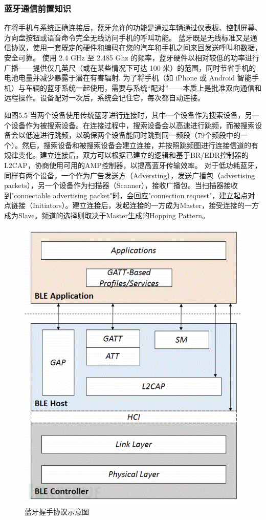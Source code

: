 \subsubsection{蓝牙通信前置知识}
在将手机与系统正确连接后，蓝牙允许的功能是通过车辆通过仪表板、控制屏幕、方向盘按钮或语音命令完全无线访问手机的呼叫功能。
蓝牙既是无线标准又是通信协议，使用一套既定的硬件和编码在您的汽车和手机之间来回发送呼叫和数据，安全可靠。
使用 2.4 GHz 至 2.485 Ghz 的频率，蓝牙硬件以相对较低的功率进行广播——提供仅几英尺（或在某些情况下可达 100 米）的范围，同时节省手机的电池电量并减少暴露于潜在有害辐射.
为了将手机（如 iPhone 或 Android 智能手机）与车辆的蓝牙系统一起使用，需要与系统“配对”——本质上是批准双向通信和远程操作。设备配对一次后，系统会记住它，每次都自动连接。

如图5.5 当两个设备使用传统蓝牙进行连接时，其中一个设备作为搜索设备，另一个设备作为被搜索设备。在连接过程中，搜索设备会以高速进行跳频，而被搜索设备会以低速进行跳频，以确保两个设备能同时跳到同一频段（79个频段中的一个）。然后，搜索设备和被搜索设备会建立连接，并按照跳频图进行连接信道的有规律变化。建立连接后，双方可以根据已建立的逻辑和基于BR/EDR控制器的L2CAP，协商使用可用的AMP控制器，以提高蓝牙传输效率。
对于低功耗蓝牙，同样有两个设备，一个作为广告发送方（Adversting），发送广播包（advertising packets），另一个设备作为扫描器（Scanner），接收广播包。当扫描器接收到"connectable advertising packet"时，会回应"connection request"，建立起点对点链接（Initiators）。建立连接后，发起连接的一方成为Master，接受连接的一方成为Slave。频道的选择则取决于Master生成的Hopping Pattern。
\begin{figure}
    \centering
    \includegraphics[scale=0.5]{resources/img/i15.png}
    \caption{蓝牙握手协议示意图}
  \end{figure}

